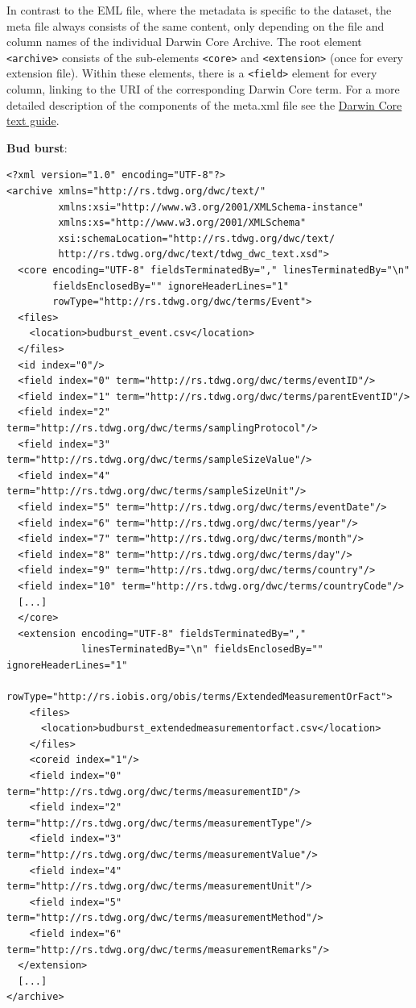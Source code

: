 \documentclass[
  oneside]{book}
\begin{document}
In contrast to the EML file, where the metadata is specific to the dataset, the meta file always consists of the same content, only depending on the file and column names of the individual Darwin Core Archive. The root element \texttt{\textless{}archive\textgreater{}} consists of the sub-elements \texttt{\textless{}core\textgreater{}} and \texttt{\textless{}extension\textgreater{}} (once for every extension file). Within these elements, there is a \texttt{\textless{}field\textgreater{}} element for every column, linking to the URI of the corresponding Darwin Core term. For a more detailed description of the components of the meta.xml file see the \href{https://dwc.tdwg.org/text/}{Darwin Core text guide}.

\begin{examplebox}

\textbf{Bud burst}:

\begin{verbatim}
<?xml version="1.0" encoding="UTF-8"?>
<archive xmlns="http://rs.tdwg.org/dwc/text/" 
         xmlns:xsi="http://www.w3.org/2001/XMLSchema-instance"
         xmlns:xs="http://www.w3.org/2001/XMLSchema"
         xsi:schemaLocation="http://rs.tdwg.org/dwc/text/
         http://rs.tdwg.org/dwc/text/tdwg_dwc_text.xsd">
  <core encoding="UTF-8" fieldsTerminatedBy="," linesTerminatedBy="\n" 
        fieldsEnclosedBy="" ignoreHeaderLines="1" 
        rowType="http://rs.tdwg.org/dwc/terms/Event">
  <files>
    <location>budburst_event.csv</location>
  </files>
  <id index="0"/>
  <field index="0" term="http://rs.tdwg.org/dwc/terms/eventID"/>
  <field index="1" term="http://rs.tdwg.org/dwc/terms/parentEventID"/>
  <field index="2" term="http://rs.tdwg.org/dwc/terms/samplingProtocol"/>
  <field index="3" term="http://rs.tdwg.org/dwc/terms/sampleSizeValue"/>
  <field index="4" term="http://rs.tdwg.org/dwc/terms/sampleSizeUnit"/>
  <field index="5" term="http://rs.tdwg.org/dwc/terms/eventDate"/>
  <field index="6" term="http://rs.tdwg.org/dwc/terms/year"/>
  <field index="7" term="http://rs.tdwg.org/dwc/terms/month"/>
  <field index="8" term="http://rs.tdwg.org/dwc/terms/day"/>
  <field index="9" term="http://rs.tdwg.org/dwc/terms/country"/>
  <field index="10" term="http://rs.tdwg.org/dwc/terms/countryCode"/>
  [...]
  </core>
  <extension encoding="UTF-8" fieldsTerminatedBy="," 
             linesTerminatedBy="\n" fieldsEnclosedBy="" ignoreHeaderLines="1"
             rowType="http://rs.iobis.org/obis/terms/ExtendedMeasurementOrFact">
    <files>
      <location>budburst_extendedmeasurementorfact.csv</location>
    </files>
    <coreid index="1"/>
    <field index="0" term="http://rs.tdwg.org/dwc/terms/measurementID"/>
    <field index="2" term="http://rs.tdwg.org/dwc/terms/measurementType"/>
    <field index="3" term="http://rs.tdwg.org/dwc/terms/measurementValue"/>
    <field index="4" term="http://rs.tdwg.org/dwc/terms/measurementUnit"/>
    <field index="5" term="http://rs.tdwg.org/dwc/terms/measurementMethod"/>
    <field index="6" term="http://rs.tdwg.org/dwc/terms/measurementRemarks"/>
  </extension>
  [...]
</archive>
\end{verbatim}

\end{examplebox}
\end{document}
